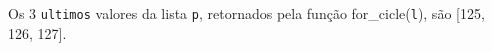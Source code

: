 \documentclass[12pt,varwidth=16cm,border=1pt]{standalone}
\begin{document}
Os 3 \verb+ultimos+ valores da lista \verb+p+, retornados pela função for\_cicle(\verb+l+), são [125, 126, 127].

\questiomfalse
\end{document}
